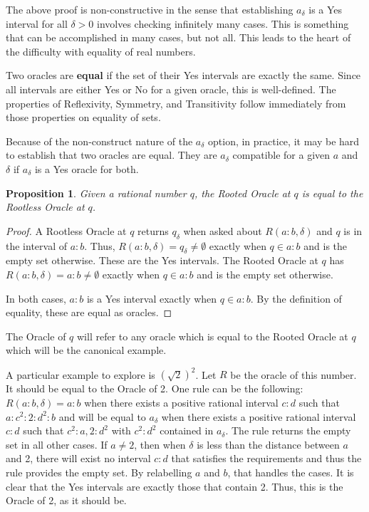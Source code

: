 \documentclass[12pt]{article}
\newtheorem{proposition}{Proposition}[section]
\begin{document}
The above proof is non-constructive in the sense that establishing $a_\delta$ is a Yes interval for all $\delta > 0$ involves checking infinitely many cases. This is something that can be accomplished in many cases, but not all. This leads to the heart of the difficulty with equality of real numbers. 

Two oracles are \textbf{equal} if the set of their Yes intervals are exactly the same. Since all intervals are either Yes or No for a given oracle, this is well-defined. The properties of Reflexivity, Symmetry, and Transitivity follow immediately from those properties on equality of sets. 

Because of the non-construct nature of the $a_\delta$ option, in practice, it may be hard to establish that two oracles are equal. They are $a_\delta$ compatible for a given $a$ and $\delta$ if $a_\delta$ is a Yes oracle for both. 

\begin{proposition}
    Given a rational number $q$, the Rooted Oracle at $q$ is equal to the Rootless Oracle at $q$. 
\end{proposition}

\begin{proof}
    A Rootless Oracle at $q$ returns $q_\delta$ when asked about $R(a:b, \delta)$ and $q$ is in the interval of $a:b$. Thus, $R(a:b, \delta) = q_\delta \neq \emptyset$ exactly when $q \in a:b$ and is the empty set otherwise. These are the Yes intervals. The Rooted Oracle at $q$ has $R(a:b, \delta) = a:b \neq \emptyset $ exactly when $q \in a:b$ and is the empty set otherwise. 

    In both cases, $a:b$ is a Yes interval exactly when $q \in a:b$. By the definition of equality, these are equal as oracles. 
\end{proof}

The Oracle of $q$ will refer to any oracle which is equal to the Rooted Oracle at $q$ which will be the canonical example. 

A particular example to explore is $(\sqrt{2})^2$. Let $R$ be the oracle of this number. It should be equal to the Oracle of 2. One rule can be the following: $R(a:b, \delta) =a:b$ when there exists a positive rational interval $c:d$ such that $a:c^2:2:d^2:b$ and will be equal to $a_\delta$ when there exists a positive rational interval $c:d$ such that $c^2:{a, 2}:d^2$ with $c^2:d^2$ contained in $a_\delta$. The rule returns the empty set in all other cases. If $a \neq 2$,  then when $\delta$ is less than the distance between $a$ and 2, there will exist no interval $c:d$ that satisfies the requirements and thus the rule provides the empty set. By relabelling $a$ and $b$, that handles the cases. It is clear that the Yes intervals are exactly those that contain 2. Thus, this is the Oracle of 2, as it should be. 
\end{document}
